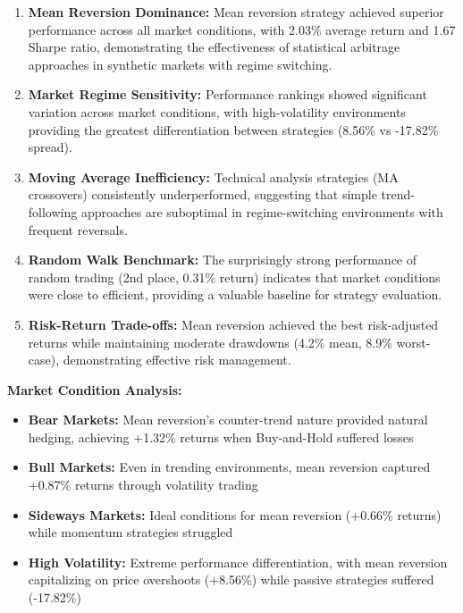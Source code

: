 \documentclass[11pt,a4paper]{article}
\begin{document}
\begin{enumerate}
\item \textbf{Mean Reversion Dominance:} Mean reversion strategy achieved superior performance across all market conditions, with 2.03\% average return and 1.67 Sharpe ratio, demonstrating the effectiveness of statistical arbitrage approaches in synthetic markets with regime switching.

\item \textbf{Market Regime Sensitivity:} Performance rankings showed significant variation across market conditions, with high-volatility environments providing the greatest differentiation between strategies (8.56\% vs -17.82\% spread).

\item \textbf{Moving Average Inefficiency:} Technical analysis strategies (MA crossovers) consistently underperformed, suggesting that simple trend-following approaches are suboptimal in regime-switching environments with frequent reversals.

\item \textbf{Random Walk Benchmark:} The surprisingly strong performance of random trading (2nd place, 0.31\% return) indicates that market conditions were close to efficient, providing a valuable baseline for strategy evaluation.

\item \textbf{Risk-Return Trade-offs:} Mean reversion achieved the best risk-adjusted returns while maintaining moderate drawdowns (4.2\% mean, 8.9\% worst-case), demonstrating effective risk management.

\end{enumerate}
\textbf{Market Condition Analysis:}
\begin{itemize}
\item \textbf{Bear Markets:} Mean reversion's counter-trend nature provided natural hedging, achieving +1.32\% returns when Buy-and-Hold suffered losses
\item \textbf{Bull Markets:} Even in trending environments, mean reversion captured +0.87\% returns through volatility trading
\item \textbf{Sideways Markets:} Ideal conditions for mean reversion (+0.66\% returns) while momentum strategies struggled
\item \textbf{High Volatility:} Extreme performance differentiation, with mean reversion capitalizing on price overshoots (+8.56\%) while passive strategies suffered (-17.82\%)

\end{itemize}
\end{document}
